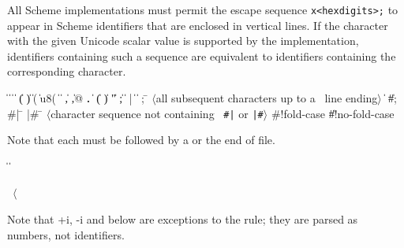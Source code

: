 All Scheme implementations must permit the escape sequence
{\tt \backwhack{}x<hexdigits>;}
to appear in Scheme identifiers that are enclosed in vertical lines. If the character
with the given Unicode scalar value is supported by the implementation,
identifiers containing such a sequence are equivalent to identifiers
containing the corresponding character. 

\begin{grammar}%
 \:  \|  \| 
\>  \|  \| 
\>  \| ( \| ) \| \sharpsign( \| \sharpsign u8( \| \singlequote{} \| \backquote{} \| , \| ,@ \| {\bf.}
 \:  \| 
\> \| ( \| ) \| " \| ;
 \: 
 \:  \| 
 \: |
 \:  \|  
\> \| 
 \: ; \= $\langle$\rm all subsequent characters up to a
		    \>\ \rm line ending$\rangle$
\> \| 
\> \| \#;  
 \: \#| \= 
\>  |\#
 \: \= $\langle$\rm character sequence not containing
\>\ \rm {\tt \#|} or {\tt |\#}$\rangle$
 \:  
 \: \#!fold-case \| \#!no-fold-case%
\end{grammar}

Note that each  must be followed by a 
or the end of file.

\begin{grammar}%
 \:  \|  \| 
 \: %
\end{grammar}

\label{extendedalphas}
\label{identifiersyntax}

\hbox{\cf{} \goesto{} $\langle$}

Note that {\cf +i}, {\cf -i} and  below are exceptions to the
 rule; they are parsed as numbers, not
identifiers.

